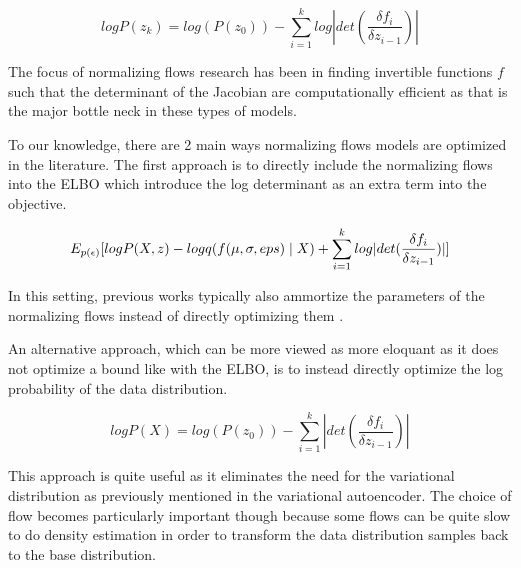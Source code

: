 
\begin{equation}
	logP(z_{k}) = log(P(z_{0})) - \sum_{i=1}^{k} log |det (\frac{\delta f_{i}}{\delta z_{i-1}}) |
\end{equation}

The focus of normalizing flows research has been in finding invertible functions $f$ such that the determinant of the Jacobian are computationally efficient as that is the major bottle neck in these types of models. 

To our knowledge, there are 2 main ways normalizing flows models are optimized in the literature. The first approach is to directly include the normalizing flows into the \ac{ELBO} which introduce the log determinant as an extra term into the objective.

\begin{equation}
E_{p(\epsilon)} [ log P(X, z) - log q( f(\mu, \sigma, eps) \; | \;{X}) + \sum_{i=1}^{k}log |det (\frac{\delta f_{i}}{\delta z_{i-1}}) | ]
\end{equation}

In this setting, previous works typically also ammortize the parameters of the normalizing flows instead of directly optimizing them  \cite{rezende2015VIwithNF,tomczak2016Householder,vdberg2018sylvester}. 

An alternative approach, which can be more viewed as more eloquant as it does not optimize a bound like with the \ac{ELBO}, is to instead directly optimize the log probability of the data distribution.
 
\begin{equation}
	logP(X) = log(P(z_{0})) - \sum_{i=1}^{k} |det (\frac{\delta f_{i}}{\delta z_{i-1}}) |
\end{equation}

This approach is quite useful as it eliminates the need for the variational distribution as previously mentioned in the variational autoencoder. The choice of flow becomes particularly important though because some flows can be quite slow to do density estimation in order to transform the data distribution samples back to the base distribution. 





